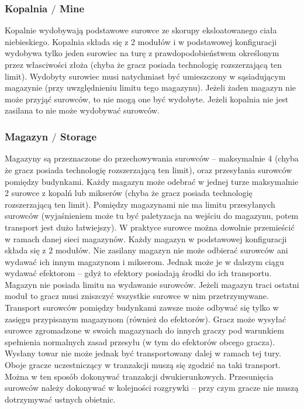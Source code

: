 \documentclass[11pt,a4paper]{article}
\begin{document}
\subsubsection{Kopalnia $/$ Mine }

Kopalnie wydobywają podstawowe surowce ze skorupy eksloatowanego ciała niebieskiego. Kopalnia składa się z 2 modułów i w podstawowej konfiguracji wydobywa tylko jeden surowiec na turę z prawdopodobieństwem określonym przez własciwości złoża (chyba że gracz posiada technologię rozszerzającą ten limit). Wydobyty surowiec musi natychmiast być umieszczony w sąsiadującym magazynie (przy uwzględnieniu limitu tego magazynu). Jeżeli żaden magazyn nie może przyjąć surowców, to nie mogą one być wydobyte. Jeżeli kopalnia nie jest zasilana to nie może wydobywać surowców.

\subsubsection{Magazyn $/$ Storage}

Magazyny są przeznaczone do przechowywania surowców -- maksymalnie 4 (chyba że gracz posiada technologię rozszerzającą ten limit), oraz przesyłania surowców pomiędzy budynkami. Każdy magazyn może odebrać w jednej turze maksymalnie 2 surowce z kopalń lub mikserów (chyba że gracz posiada technologię rozszerzającą ten limit). Pomiędzy magazynami nie ma limitu przesyłanych surowców (wyjaśnieniem może tu być paletyzacja na wejściu do magazynu, potem transport jest dużo łatwiejszy). W praktyce surowce można dowolnie przemieścić w ramach danej sieci magazynów. Każdy magazyn w podstawowej konfiguracji składa się z 2 modułów. Nie zasilany magazyn nie może odbierać surowców ani wydawać ich innym magazynom i mikserom. Jednak może je w dalszym ciągu wydawać efektorom -- gdyż to efektory posiadają środki do ich transportu. Magazyn nie posiada limitu na wydawanie surowców. Jeżeli magazyn traci ostatni moduł to gracz musi zniszczyć wszystkie surowce w nim przetrzymywane. Transport surowców pomiędzy budynkami zawsze może odbywać się tylko w zasięgu przypisanym magazynom (również do efektorów). Gracz może wysyłać surowce zgromadzone w swoich magazynach do innych graczy pod warunkiem spełnienia normalnych zasad przesyłu (w tym do efektorów obcego gracza). Wysłany towar nie może jednak być transportowany dalej w ramach tej tury. Oboje gracze uczestniczący w tranzakcji muszą się zgodzić na taki transport. Można w ten sposób dokonywać tranzakcji dwukierunkowych. Przesunięcia surowców należy dokonywać w kolejności rozgrywki -- przy czym gracze nie muszą dotrzymywać ustnych obietnic.
\end{document}
